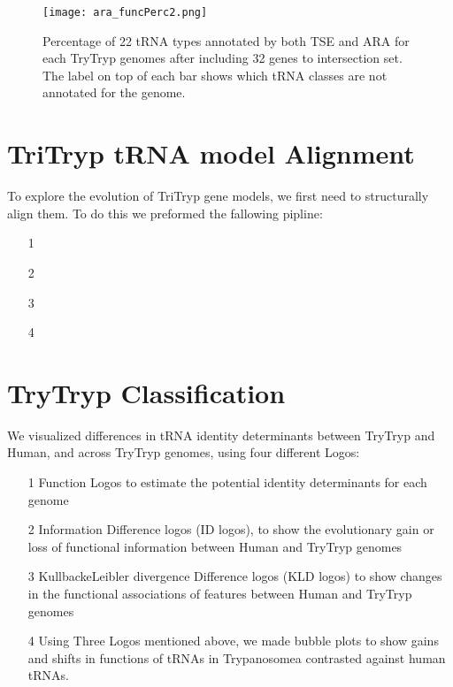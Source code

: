 \documentclass[
10pt, %
a4paper, %
oneside, %
headinclude,footinclude, %
BCOR5mm, %
]{scrartcl}
\begin{document}
\begin{figure}[tb]
\centering 
\texttt{[image: ara\_funcPerc2.png]} 
\caption[Genome Comparison]{Percentage of 22 tRNA types annotated by both TSE and ARA for each TryTryp genomes after including 32 genes to intersection set. The label on top of each bar shows which tRNA classes are not annotated for the genome.} %
\label{fig:typesimproved} 
\end{figure}

\section{TriTryp tRNA model Alignment}
To explore the evolution of TriTryp gene models, we first need to structurally align them. To do this we preformed the fallowing pipline: 
\begin{enumerate}[noitemsep]

\item[1] 
\item[2]
\item[3]
\item[4]

\end{enumerate}

\section{TryTryp Classification}


We visualized differences in tRNA identity determinants between TryTryp and Human, and across TryTryp genomes, using four different Logos: 
\begin{enumerate}[noitemsep]

\item[1] Function Logos to estimate the potential identity determinants for each genome 
\item[2] Information Difference logos (ID logos), to show the evolutionary gain or loss of functional information between Human and TryTryp genomes 
\item[3] KullbackeLeibler divergence Difference logos (KLD logos) to show changes in the functional associations of features between Human and TryTryp genomes
\item[4] Using Three Logos mentioned above, we made bubble plots to show gains and shifts in functions of tRNAs in Trypanosomea contrasted against human tRNAs.

\end{enumerate}
\end{document}
